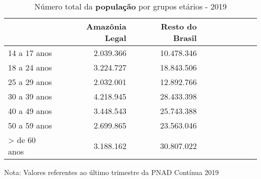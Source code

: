 \begin{table}[H]
\centering
\label{\_retrato\_emprego\_fotografia\_faixa\_etaria\_table\_ocupados}
\begin{threeparttable}
\caption{Número total da \textbf{população} por grupos etários - 2019}
\begin{tabular}{l*{3}{rrr}}
\midrule \midrule
                    &Amazônia Legal&Resto do Brasil\\
\midrule
14 a 17 anos        &   2.039.366&  10.478.346\\
18 a 24 anos        &   3.224.727&  18.843.506\\
25 a 29 anos        &   2.032.001&  12.892.766\\
30 a 39 anos        &   4.218.945&  28.433.398\\
40 a 49 anos        &   3.448.543&  25.743.388\\
50 a 59 anos        &   2.699.865&  23.563.046\\
> de 60 anos        &   3.188.162&  30.807.022\\
\bottomrule
\end{tabular}
\begin{tablenotes}
\scriptsize{Nota: Valores referentes ao último trimestre da PNAD Contínua 2019}
\end{tablenotes}
\end{threeparttable}
\end{table}
